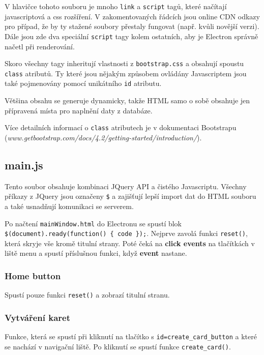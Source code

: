 \documentclass[11pt]{article}
\let\oldtexttt\texttt
\renewcommand{\texttt}[1]{\oldtexttt{\textcolor{codehighlight}{#1}}}
\begin{document}
V hlavičce tohoto souboru je mnoho \texttt{link} a \texttt{script} tagů,
které načítají javascriptová a css rozšíření. V zakomentovaných řádcích
jsou online CDN odkazy pro případ, že by ty stažené soubory přestaly
fungovat (např. kvůli novější verzi). Dále jsou zde dva speciální
\texttt{script} tagy kolem ostatních, aby je Electron správně načetl při
renderování.

Skoro všechny tagy inheritují vlastnosti z \texttt{bootstrap.css} a
obsahují spoustu \texttt{class} atributů. Ty které jsou nějakým způsobem
ovládány Javascriptem jsou také pojmenovány pomocí unikátního
\texttt{id} atributu.

Většina obsahu se generuje dynamicky, takže HTML samo o sobě obsahuje
jen přípravená místa pro naplnění daty z databáze.

Více detailních informací o \texttt{class} atributech je v dokumentaci
Bootstrapu
(\emph{www.getbootstrap.com/docs/4.2/getting-started/introduction/}).

\hypertarget{main.js}{%
\subsection{main.js}\label{main.js}}

Tento soubor obsahuje kombinaci JQuery API a čistého Javascriptu.
Všechny příkazy z JQuery jsou označeny \texttt{\$} a zajišťují lepší
import dat do HTML souboru a také usnadňují komunikaci se serverem.

Po načtení \texttt{mainWindow.html} do Electronu se spustí blok
\texttt{\$(document).ready(function()\ \{\ code\ \});}. Nejprve zavolá
funkci \texttt{reset()}, která skryje vše kromě titulní strany. Poté
čeká na \textbf{click events} na tlačítkách v liště menu a spustí
příslušnou funkci, když \textbf{event} nastane.

\hypertarget{home-button}{%
\subsubsection{Home button}\label{home-button}}

Spustí pouze funkci \texttt{reset()} a zobrazí titulní stranu.

\hypertarget{vytvuxe1ux159enuxed-karet}{%
\subsubsection{Vytváření karet}\label{vytvuxe1ux159enuxed-karet}}

Funkce, která se spustí při kliknutí na tlačítko s
\texttt{id=create\_card\_button} a které se nachází v navigační liště.
Po kliknutí se spustí funkce \texttt{create\_card()}.
\end{document}

